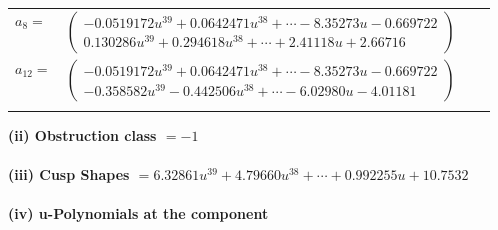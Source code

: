 \documentclass[1p]{elsarticle_modified}
\theoremstyle{definition}
\begin{document}
\begin{tabular}{m{7pt} m{180pt} m{7pt} m{180pt} }
\flushright $a_{8}=$&$\begin{pmatrix}-0.0519172 u^{39}+0.0642471 u^{38}+\cdots-8.35273 u-0.669722\\0.130286 u^{39}+0.294618 u^{38}+\cdots+2.41118 u+2.66716\end{pmatrix}$ \\
\flushright $a_{12}=$&$\begin{pmatrix}-0.0519172 u^{39}+0.0642471 u^{38}+\cdots-8.35273 u-0.669722\\-0.358582 u^{39}-0.442506 u^{38}+\cdots-6.02980 u-4.01181\end{pmatrix}$\\&\end{tabular}
\flushleft \textbf{(ii) Obstruction class $= -1$}\\~\\
\flushleft \textbf{(iii) Cusp Shapes $= 6.32861 u^{39}+4.79660 u^{38}+\cdots+0.992255 u+10.7532$}\\~\\
\newpage\renewcommand{\arraystretch}{1}
\flushleft \textbf{(iv) u-Polynomials at the component}\newline \\
\end{document}
